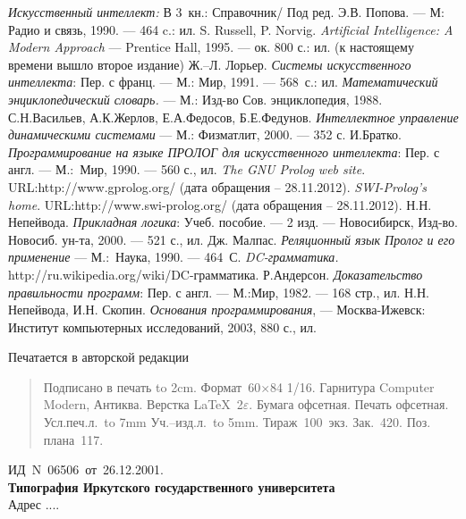 \documentclass[12pt, openany, twoside]{book} %
\begin{document}
\begin{thebibliography}{99}
 \emph{Искусственный интеллект:} В 3~кн.:
Справочник/ Под ред. Э.В. Попова. --- М: Радио и связь, 1990. --- 464 c.: ил.
 S. Russell, P. Norvig. \emph{Artificial Intelligence: A Modern Approach} --- Prentice Hall, 1995. --- ок. 800 с.: ил. (к настоящему времени вышло второе издание)
 Ж.--Л. Лорьер. \emph{Системы искусственного
интеллекта}: Пер. с франц. --- М.: Мир, 1991. --- 568~с.: ил.
 \emph{Математический энциклопедический словарь.} ---
М.: Изд-во Сов. энциклопедия, 1988.
 С.Н.Васильев, А.К.Жерлов, Е.А.Федосов, Б.Е.Федунов.
\emph{Интеллектное управление динамическими системами} --- М.:
Физматлит, 2000. --- 352 с.
 И.Братко. \emph{Программирование на языке ПРОЛОГ для
искусственного интеллекта}: Пер. с англ. --- М.:~Мир, 1990. --- 560 с., ил.
 \emph{The GNU Prolog web site}. URL:http://www.gprolog.org/ (дата обращения -- 28.11.2012).
 \emph{SWI-Prolog's home}. URL:http://www.swi-prolog.org/ (дата обращения -- 28.11.2012).
 Н.Н. Непейвода. \emph{Прикладная логика}: Учеб. пособие.
--- 2 изд. --- Новосибирск, Изд-во. Новосиб. ун-та, 2000. --- 521 с., ил.
 Дж. Малпас. \emph{Реляционный язык Пролог и его применение} ---
М.:~Наука, 1990. --- 464~С.
 \emph{DC-грамматика.} http://ru.wikipedia.org/wiki/DC-грамматика.
 Р.Андерсон. \emph{Доказательство правильности программ}:
Пер. с англ. --- М.:Мир, 1982. --- 168 стр., ил.
Н.Н. Непейвода, И.Н. Скопин. \emph{Основания программирования}, — Москва-Ижевск: Институт компьютерных исследований, 2003, 880 с., ил.
\end{thebibliography}
\label{pg:lastpage}

\newpage
\thispagestyle{empty}
\hbox{}
\vfill
\begin{center}
Печатается в авторской редакции\\[1em]
\end{center}
\begin{quote}
\noindent Подписано в печать \hbox to 2cm{}.
Формат~60$\times$84 1/16. Гарнитура Computer Modern, Антиква.
Верстка \LaTeX~2$\varepsilon$.
Бумага офсетная. Печать офсетная. Усл.печ.л.~\hbox to 7mm{}
Уч.--изд.л.~\hbox to 5mm{}. Тираж~100~экз. Зак.~420.
Поз. плана~117.
\end{quote}
\begin{center}
ИД~N~06506~от~26.12.2001.\\
{\bf Типография Иркутского государственного университета}\\
Адрес ....
\end{center}
\end{document}
